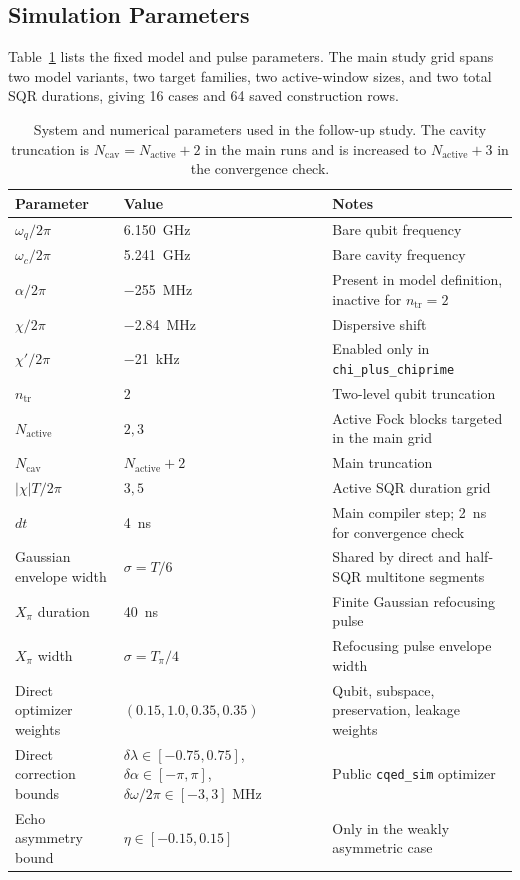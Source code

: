 \documentclass[aps,pra,twocolumn,reprint,floatfix,amsmath,amssymb]{revtex4-2}
\begin{document}
\subsection{Simulation Parameters}
Table~\ref{tab:params} lists the fixed model and pulse parameters. The main study grid spans two model variants, two target families, two active-window sizes, and two total SQR durations, giving 16 cases and 64 saved construction rows.

\begin{table}[t]
\centering
\caption{System and numerical parameters used in the follow-up study. The cavity truncation is $N_{\mathrm{cav}}=N_{\mathrm{active}}+2$ in the main runs and is increased to $N_{\mathrm{active}}+3$ in the convergence check.}
\label{tab:params}
\begin{tabular}{@{}lll@{}}
\toprule
Parameter & Value & Notes \\
\midrule
$\omega_q/2\pi$ & \SI{6.150}{\giga\hertz} & Bare qubit frequency \\
$\omega_c/2\pi$ & \SI{5.241}{\giga\hertz} & Bare cavity frequency \\
$\alpha/2\pi$ & \SI{-255}{\mega\hertz} & Present in model definition, inactive for $n_{\mathrm{tr}}=2$ \\
$\chi/2\pi$ & \SI{-2.84}{\mega\hertz} & Dispersive shift \\
$\chi'/2\pi$ & \SI{-21}{\kilo\hertz} & Enabled only in \texttt{chi\_plus\_chiprime} \\
$n_{\mathrm{tr}}$ & $2$ & Two-level qubit truncation \\
$N_{\mathrm{active}}$ & $2,3$ & Active Fock blocks targeted in the main grid \\
$N_{\mathrm{cav}}$ & $N_{\mathrm{active}}+2$ & Main truncation \\
$|\chi|T/2\pi$ & $3,5$ & Active SQR duration grid \\
$dt$ & \SI{4}{\nano\second} & Main compiler step; \SI{2}{\nano\second} for convergence check \\
Gaussian envelope width & $\sigma=T/6$ & Shared by direct and half-SQR multitone segments \\
$X_\pi$ duration & \SI{40}{\nano\second} & Finite Gaussian refocusing pulse \\
$X_\pi$ width & $\sigma=T_\pi/4$ & Refocusing pulse envelope width \\
Direct optimizer weights & $(0.15,1.0,0.35,0.35)$ & Qubit, subspace, preservation, leakage weights \\
Direct correction bounds & $\delta\lambda\in[-0.75,0.75]$, $\delta\alpha\in[-\pi,\pi]$, $\delta\omega/2\pi\in[-3,3]$ MHz & Public \texttt{cqed\_sim} optimizer \\
Echo asymmetry bound & $\eta\in[-0.15,0.15]$ & Only in the weakly asymmetric case \\
\bottomrule
\end{tabular}
\end{table}
\end{document}
